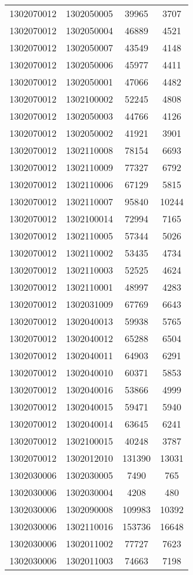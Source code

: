 \begin{longtable}{llcc}
1302070012 & 1302050005 & 39965 & 3707\\
1302070012 & 1302050004 & 46889 & 4521\\
1302070012 & 1302050007 & 43549 & 4148\\
1302070012 & 1302050006 & 45977 & 4411\\
1302070012 & 1302050001 & 47066 & 4482\\
1302070012 & 1302100002 & 52245 & 4808\\
1302070012 & 1302050003 & 44766 & 4126\\
1302070012 & 1302050002 & 41921 & 3901\\
1302070012 & 1302110008 & 78154 & 6693\\
1302070012 & 1302110009 & 77327 & 6792\\
1302070012 & 1302110006 & 67129 & 5815\\
1302070012 & 1302110007 & 95840 & 10244\\
1302070012 & 1302100014 & 72994 & 7165\\
1302070012 & 1302110005 & 57344 & 5026\\
1302070012 & 1302110002 & 53435 & 4734\\
1302070012 & 1302110003 & 52525 & 4624\\
1302070012 & 1302110001 & 48997 & 4283\\
1302070012 & 1302031009 & 67769 & 6643\\
1302070012 & 1302040013 & 59938 & 5765\\
1302070012 & 1302040012 & 65288 & 6504\\
1302070012 & 1302040011 & 64903 & 6291\\
1302070012 & 1302040010 & 60371 & 5853\\
1302070012 & 1302040016 & 53866 & 4999\\
1302070012 & 1302040015 & 59471 & 5940\\
1302070012 & 1302040014 & 63645 & 6241\\
1302070012 & 1302100015 & 40248 & 3787\\
1302070012 & 1302012010 & 131390 & 13031\\
1302030006 & 1302030005 & 7490 & 765\\
1302030006 & 1302030004 & 4208 & 480\\
1302030006 & 1302090008 & 109983 & 10392\\
1302030006 & 1302110016 & 153736 & 16648\\
1302030006 & 1302011002 & 77727 & 7623\\
1302030006 & 1302011003 & 74663 & 7198\\

\end{longtable}
